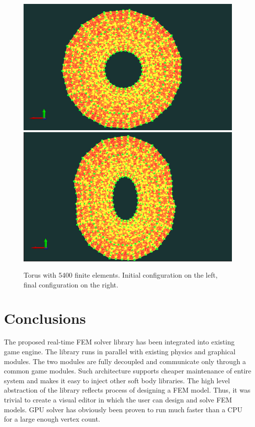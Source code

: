 \documentclass[en]{minipw} %
\begin{document}
\begin{figure}[h!]
\centering
\includegraphics[scale=0.3]{pictures/tests/5392.png}
\includegraphics[scale=0.3]{pictures/tests/5392_end.png}
\caption[Torus with 5400 finite elements]{Torus with 5400 finite elements. Initial configuration on the left, final configuration on the right.}
\label{fig:torus5400}
\end{figure}


\chapter{Conclusions}
\label{chap:Conclusions}

The proposed real-time FEM solver library has been integrated into existing game engine. The library runs in parallel with existing physics and graphical modules. The two modules are fully decoupled and communicate only through a common game modules. Such architecture supports cheaper maintenance of entire system and makes it easy to inject other  soft body libraries.
The high level abstraction of the library reflects process of designing a FEM model. Thus, it was trivial to create a visual editor in which the user can design and solve FEM models.
GPU solver has obviously been proven to run much faster than a CPU for a large enough vertex count.
\end{document}

